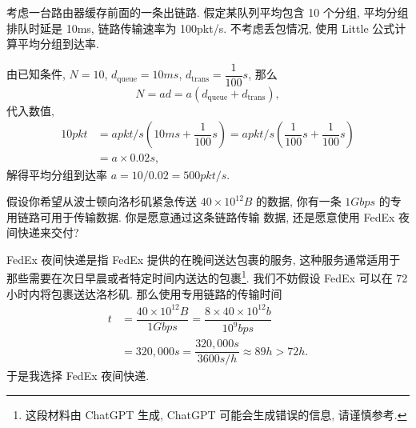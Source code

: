 \documentclass[10pt,UTF8]{ctexbook} %
\begin{document}
\begin{example}
    考虑一台路由器缓存前面的一条出链路. 假定某队列平均包含 10 个分组, 
    平均分组排队时延是 10ms, 链路传输速率为 100pkt/s.
    不考虑丢包情况, 使用 Little 公式计算平均分组到达率.
    \begin{sol}
        由已知条件, $N = 10$, $d_\mathrm{queue} = 10\si{ms}$,
        $d_\mathrm{trans} = \dfrac{1}{100} \si{s}$, 那么
        \[ N = a d 
        = a \left( d_\mathrm{queue} + d_\mathrm{trans} \right), \]
        代入数值,
        \[ 
        \begin{aligned}
            10 \si{pkt} 
            &= a \si{pkt/s} \left(
                10\si{ms} + \dfrac{1}{100}\si{s}
            \right) 
            = a \si{pkt/s} \left(
                \dfrac{1}{100} \si{s} + \dfrac{1}{100}\si{s}
            \right) \\ 
            & = a \times 0.02 \si{s},
        \end{aligned} \]
        解得平均分组到达率 $a = 10/0.02 = 500 \si{pkt/s}$.
    \end{sol}
\end{example}

\begin{example}
    假设你希望从波士顿向洛杉矶紧急传送 $40 \times 10^{12} \si{B}$ 的数据,
    你有一条 $1\si{Gbps}$ 的专用链路可用于传输数据. 你是愿意通过这条链路传输
    数据, 还是愿意使用 FedEx 夜间快递来交付?
    \begin{sol}
        FedEx 夜间快递是指 FedEx 提供的在晚间送达包裹的服务,
        这种服务通常适用于那些需要在次日早晨或者特定时间内送达的包裹\footnote{
            这段材料由 ChatGPT 生成, ChatGPT 可能会生成错误的信息, 请谨慎参考.
        }. 
        我们不妨假设 FedEx 可以在 72 小时内将包裹送达洛杉矶.
        那么使用专用链路的传输时间 
        \[ 
        \begin{aligned}
            t &= \dfrac{40 \times 10^{12} \si{B}}{1 \si{Gbps}}
            = \dfrac{8 \times 40 \times 10^{12} \si{b}}{10^9 \si{bps}} \\ 
            &= 320,000 \si{s} = \dfrac{320,000 \si{s}}{3600 \si{s/h}} 
            \approx 89 \si{h} > 72 \si{h}.
        \end{aligned} \]
        于是我选择 FedEx 夜间快递.
    \end{sol}
\end{example}
\end{document}
